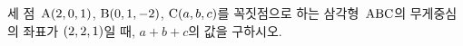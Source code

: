 세 점~$\mathrm{A}(2{,}\mkern3mu\mathopen{}0{,}\mkern3mu\mathopen{}1)$, $\mathrm{B}(0{,}\mkern3mu\mathopen{}1{,}\mkern3mu\mathopen{}-2)$, $\mathrm{C}(a{,}\mkern3mu\mathopen{}b{,}\mkern3mu\mathopen{}c)$를 꼭짓점으로 하는 삼각형~$\mathrm{ABC}$의 무게중심의 좌표가 $(2{,}\mkern3mu\mathopen{}2{,}\mkern3mu\mathopen{}1)$일 때, $a+b+c$의 값을 구하시오.
